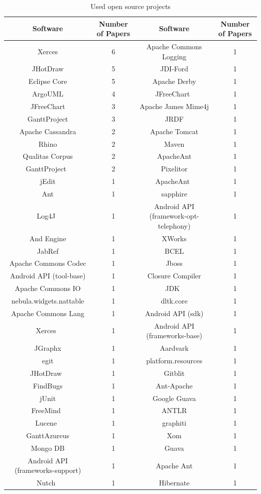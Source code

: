 \begin{longtable}{||c|c||c||c|}
\caption{Used open source projects}
\label{tab:opensourceTable}
\\

\hline
	Software & Number of Papers & Software & Number of Papers \\ \hline
	Xerces & 6 & Apache Commons Logging & 1 \\ \hline
	JHotDraw & 5 & JDI-Ford & 1 \\ \hline
	Eclipse Core & 5 & Apache Derby & 1 \\ \hline
	ArgoUML & 4 & JFreeChart  & 1 \\ \hline
	JFreeChart & 3 & Apache James Mime4j & 1 \\ \hline
	GanttProject & 3 & JRDF & 1 \\ \hline
	Apache Cassandra & 2 & Apache Tomcat & 1 \\ \hline
	Rhino & 2 & Maven & 1 \\ \hline
	Qualitas Corpus & 2 & ApacheAnt & 1 \\ \hline
	GanttProject  & 2 & Pixelitor & 1 \\ \hline
	jEdit & 1 & ApacheAnt  & 1 \\ \hline
	Ant & 1 & sapphire & 1 \\ \hline
	Log4J  & 1 & Android API (framework-opt-telephony) & 1 \\ \hline
	And Engine & 1 & XWorks & 1 \\ \hline
	JabRef & 1 & BCEL & 1 \\ \hline
	Apache Commons Codec & 1 & Jboss & 1 \\ \hline
	Android API (tool-base) & 1 & Closure Compiler & 1 \\ \hline
	Apache Commons IO & 1 & JDK  & 1 \\ \hline
	nebula.widgets.nattable & 1 & dltk.core & 1 \\ \hline
	Apache Commons Lang & 1 & Android API (sdk) & 1 \\ \hline
	Xerces  & 1 & Android API (frameworks-base) & 1 \\ \hline
	JGraphx & 1 & Aardvark & 1 \\ \hline
	egit & 1 & platform.resources & 1 \\ \hline
	JHotDraw  & 1 & Gitblit & 1 \\ \hline
	FindBugs & 1 & Ant-Apache & 1 \\ \hline
	jUnit & 1 & Google Guava & 1 \\ \hline
	FreeMind  & 1 & ANTLR & 1 \\ \hline
	Lucene  & 1 & graphiti & 1 \\ \hline
	GanttAzureus & 1 & Xom & 1 \\ \hline
	Mongo DB & 1 & Guava & 1 \\ \hline
	Android API (frameworks-support) & 1 & Apache Ant & 1 \\ \hline
	Nutch  & 1 & Hibernate & 1 \\ \hline

\end{longtable}



